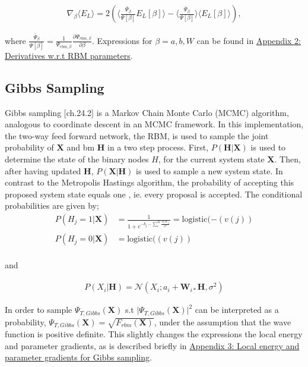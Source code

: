 \documentclass[%
oneside,                 %
final,                   %
10pt]{article}
\begin{document}
\begin{align*}
\nabla_{\beta} \langle E_L \rangle = 2 \left( \langle \frac{\bar \Psi_{\beta}}{\Psi [\beta]} E_L[\beta] \rangle - \langle \frac{\bar \Psi_{\beta}}{\Psi [\beta]} \rangle \langle E_L[\beta] \rangle  \right),
\end{align*}

where $\frac{\bar \Psi_{\beta}}{\Psi [\beta]} = \frac{1}{\Psi_{rbm,\beta} } \frac{\partial \Psi_{rbm,\beta}}{\partial \beta}$. Expressions for $\beta = a,b,W$ can be found in \hyperref[APP_2]{Appendix 2: Derivatives w.r.t RBM parameters}.

\subsection{Gibbs Sampling}
Gibbs sampling \cite{MLMurphy}[ch.24.2] is a Markov Chain Monte Carlo (MCMC) algorithm, analogous to coordinate descent in an MCMC framework. In this implementation, the two-way feed forward network, the RBM, is used to sample the joint probability of $\bm X$ and bm $\bm H$ in a two step process. First, $P(\bm H|\bm X)$ is used to determine the state of the binary nodes $ H$, for the current system state $\bm X$. Then, after having updated $\bm H$, $P(\bm X|\bm H)$ is used to sample a new system state. In contrast to the Metropolis Hastings algorithm, the probability of accepting this proposed system state equals one \cite{Flugsrud}, ie. every proposal is accepted. The conditional probabilities are given by;
\begin{equation}
\begin{aligned}
P(H_j=1|\bm X) & = \frac{1}{1+e^{-b_j-\sum_i^M \frac{X_i W_{ij}}{\sigma^2}}}=\text{logistic} (-(v(j)) \\
P(H_j=0|\bm X) & =\text{logistic} ((v(j)) \\
\end{aligned}
\label{eq:gibbs_prob_h}
\end{equation}

and

\begin{equation}
\begin{aligned}
P(X_i|\bm H) = \mathcal{N} (X_i;a_i+\bm W_{i*}\bm H,\sigma^2) 
\end{aligned}
\label{eq:gibbs_prob_x}
\end{equation}

In order to sample $\Psi_{T,Gibbs}(\bm X)$ s.t $\vert \Psi_{T,Gibbs}(\bm X) \vert^2$ can be interpreted as a probability, $\Psi_{T,Gibbs}(\bm X)=\sqrt{F_{rbm}(\bm X)}$, under the assumption that the wave function is positive definite. This slightly changes the expressions the local energy and parameter gradients, as is described briefly in \hyperref[APP_3]{Appendix 3: Local energy and parameter gradients for Gibbs sampling}. 
\end{document}
